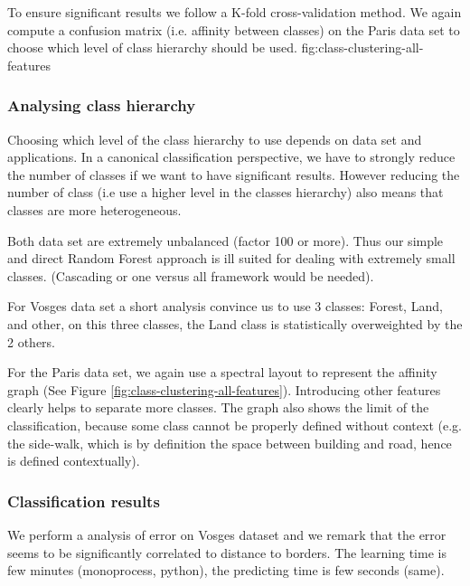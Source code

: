 		To ensure significant results we follow a K-fold cross-validation method. We again compute a confusion matrix (i.e. affinity between classes) on the Paris data set to choose which level of class hierarchy should be used.
		fig:class-clustering-all-features
		
		
		\subsubsection{Analysing class hierarchy} 
		Choosing which level of the class hierarchy to use depends on data set and applications.
		In a canonical classification perspective, we have to strongly reduce the number of classes if we want to have significant results.
		However reducing the number of class (i.e use a higher level in the classes hierarchy) also means that classes are more heterogeneous.
		  
		Both data set are extremely unbalanced (factor 100 or more). Thus our simple and direct Random Forest approach is ill suited for dealing with extremely small classes. (Cascading or one versus all framework would be needed).
		
		For Vosges data set a short analysis convince us to use 3 classes: Forest, Land, and other, on this three classes, the Land class is statistically overweighted by the 2 others.
		
		For the Paris data set, we again use a spectral layout to represent the affinity graph (See Figure \ref{fig:class-clustering-all-features}).
		Introducing other features clearly helps to separate more classes.
		The graph also shows the limit of the classification, because some class cannot be properly defined without context (e.g. the side-walk, which is by definition the space between building and road, hence is defined contextually). 
		
				
		\subsubsection{Classification results}
		We perform a analysis of error on Vosges dataset and we remark that the error seems to be significantly correlated to distance to borders.
		The learning time is few minutes (monoprocess, python), the predicting time is few seconds (same).
				 
